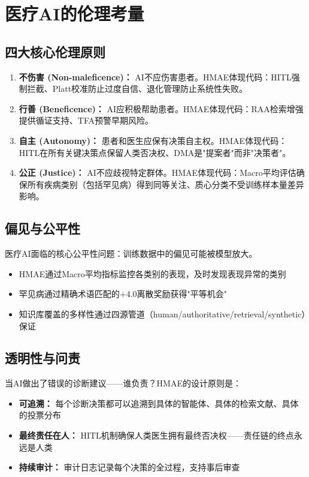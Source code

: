 \documentclass[11pt,a4paper]{ctexart}
\begin{document}
\newpage

\section{医疗AI的伦理考量}

\subsection{四大核心伦理原则}

\begin{enumerate}[nosep]
\item \textbf{不伤害 (Non-maleficence)：} AI不应伤害患者。HMAE体现代码：HITL强制拦截、Platt校准防止过度自信、退化管理防止系统性失败。
\item \textbf{行善 (Beneficence)：} AI应积极帮助患者。HMAE体现代码：RAA检索增强提供循证支持、TFA预警早期风险。
\item \textbf{自主 (Autonomy)：} 患者和医生应保有决策自主权。HMAE体现代码：HITL在所有关键决策点保留人类否决权、DMA是"提案者"而非"决策者"。
\item \textbf{公正 (Justice)：} AI不应歧视特定群体。HMAE体现代码：Macro平均评估确保所有疾病类别（包括罕见病）得到同等关注、质心分类不受训练样本量差异影响。
\end{enumerate}

\subsection{偏见与公平性}

医疗AI面临的核心公平性问题：训练数据中的偏见可能被模型放大。
\begin{itemize}[nosep]
\item HMAE通过Macro平均指标监控各类别的表现，及时发现表现异常的类别
\item 罕见病通过精确术语匹配的+4.0离散奖励获得"平等机会"
\item 知识库覆盖的多样性通过四源管道（human/authoritative/retrieval/synthetic）保证
\end{itemize}

\subsection{透明性与问责}

当AI做出了错误的诊断建议——谁负责？HMAE的设计原则是：
\begin{itemize}[nosep]
\item \textbf{可追溯：} 每个诊断决策都可以追溯到具体的智能体、具体的检索文献、具体的投票分布
\item \textbf{最终责任在人：} HITL机制确保人类医生拥有最终否决权——责任链的终点永远是人类
\item \textbf{持续审计：} 审计日志记录每个决策的全过程，支持事后审查
\end{itemize}
\end{document}
